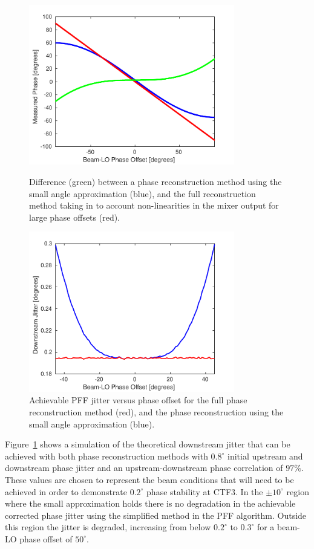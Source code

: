\begin{figure}
  \centering
  \includegraphics[width=0.8\textwidth]{Figures/commissioning/phaseRecDiff}
  \caption{Difference (green) between a phase reconstruction method using the small angle approximation (blue), and the full reconstruction method taking in to account non-linearities in the mixer output for large phase offsets (red).}
  \label{f:phaseRecDiff}
  \centering
  \includegraphics[width=0.8\textwidth]{Figures/commissioning/phaseRecJitSim}
  \caption{Achievable PFF jitter versus phase offset for the full phase reconstruction method (red), and the phase reconstruction using the small angle approximation (blue).}
  \label{f:phaseRecJitSim}
\end{figure}

Figure~\ref{f:phaseRecJitSim} shows a simulation of the theoretical downstream jitter that can be achieved with both phase reconstruction methods with \(0.8^\circ\) initial upstream and downstream phase jitter and an upstream-downstream phase correlation of \(97\%\). These values are chosen to represent the beam conditions that will need to be achieved in order to demonstrate \(0.2^\circ\) phase stability at CTF3. In the \(\pm10^\circ\) region where the small approximation holds there is no degradation in the achievable corrected phase jitter using the simplified method in the PFF algorithm. Outside this region the jitter is degraded, increasing from below \(0.2^\circ\) to \(0.3^\circ\) for a beam-LO phase offset of \(50^\circ\). 


